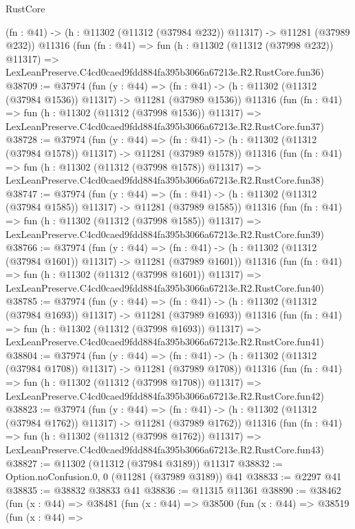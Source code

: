 \begin{lexlean}{RustCore}
\begin{coremodule}
    (fn : @41) -> (h : @11302 (@11312 (@37984 @232)) @11317) -> @11281 (@37989 @232))
    @11316
    (fun (fn : @41) =>
    fun (h : @11302 (@11312 (@37998 @232)) @11317) =>
    LexLeanPreserve.C4cd0caed9fdd884fa395b3066a67213e.R2.RustCore.fun36)
@38709 := @37974
    (fun (y : @44) =>
    (fn : @41) -> (h : @11302 (@11312 (@37984 @1536)) @11317) -> @11281 (@37989 @1536))
    @11316
    (fun (fn : @41) =>
    fun (h : @11302 (@11312 (@37998 @1536)) @11317) =>
    LexLeanPreserve.C4cd0caed9fdd884fa395b3066a67213e.R2.RustCore.fun37)
@38728 := @37974
    (fun (y : @44) =>
    (fn : @41) -> (h : @11302 (@11312 (@37984 @1578)) @11317) -> @11281 (@37989 @1578))
    @11316
    (fun (fn : @41) =>
    fun (h : @11302 (@11312 (@37998 @1578)) @11317) =>
    LexLeanPreserve.C4cd0caed9fdd884fa395b3066a67213e.R2.RustCore.fun38)
@38747 := @37974
    (fun (y : @44) =>
    (fn : @41) -> (h : @11302 (@11312 (@37984 @1585)) @11317) -> @11281 (@37989 @1585))
    @11316
    (fun (fn : @41) =>
    fun (h : @11302 (@11312 (@37998 @1585)) @11317) =>
    LexLeanPreserve.C4cd0caed9fdd884fa395b3066a67213e.R2.RustCore.fun39)
@38766 := @37974
    (fun (y : @44) =>
    (fn : @41) -> (h : @11302 (@11312 (@37984 @1601)) @11317) -> @11281 (@37989 @1601))
    @11316
    (fun (fn : @41) =>
    fun (h : @11302 (@11312 (@37998 @1601)) @11317) =>
    LexLeanPreserve.C4cd0caed9fdd884fa395b3066a67213e.R2.RustCore.fun40)
@38785 := @37974
    (fun (y : @44) =>
    (fn : @41) -> (h : @11302 (@11312 (@37984 @1693)) @11317) -> @11281 (@37989 @1693))
    @11316
    (fun (fn : @41) =>
    fun (h : @11302 (@11312 (@37998 @1693)) @11317) =>
    LexLeanPreserve.C4cd0caed9fdd884fa395b3066a67213e.R2.RustCore.fun41)
@38804 := @37974
    (fun (y : @44) =>
    (fn : @41) -> (h : @11302 (@11312 (@37984 @1708)) @11317) -> @11281 (@37989 @1708))
    @11316
    (fun (fn : @41) =>
    fun (h : @11302 (@11312 (@37998 @1708)) @11317) =>
    LexLeanPreserve.C4cd0caed9fdd884fa395b3066a67213e.R2.RustCore.fun42)
@38823 := @37974
    (fun (y : @44) =>
    (fn : @41) -> (h : @11302 (@11312 (@37984 @1762)) @11317) -> @11281 (@37989 @1762))
    @11316
    (fun (fn : @41) =>
    fun (h : @11302 (@11312 (@37998 @1762)) @11317) =>
    LexLeanPreserve.C4cd0caed9fdd884fa395b3066a67213e.R2.RustCore.fun43)
@38827 := @11302 (@11312 (@37984 @3189)) @11317
@38832 := Option.noConfusion.{0, 0} (@11281 (@37989 @3189)) @41
@38833 := @2297 @41
@38835 := @38832 @38833 @41
@38836 := @11315 @11361
@38890 := @38462
    (fun (x : @44) =>
    @38481
      (fun (x : @44) =>
      @38500
        (fun (x : @44) =>
        @38519
          (fun (x : @44) =>

\end{coremodule}
\end{lexlean}
